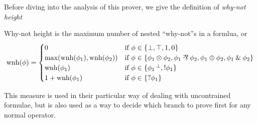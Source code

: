 \documentclass[a4paper, 12pt, tesi, english]{report}
\begin{document}
Before diving into the analysis of this prover, we give the definition of \textit{why-not height}
\begin{define}
	\label{def:why-not-height}
	Why-not height is the maximum number of nested ``why-not''s in a formlua, or
	$$ \text{wnh}(\phi) = 
	\begin{cases}	
		0 & \text{if }\phi \in \{\llbot, \lltop, \llone, \llzero\} \\
		\max(\text{wnh}(\phi_1), \text{wnh}(\phi_2)) & \text{if } \phi \in \{ \phi_1 \llten \phi_2, \phi_1 \llpar \phi_2, \phi_1 \llplus \phi_2, \phi_1 \llwith \phi_2 \} \\
		\text{wnh}(\phi_1) & \text{if }\phi \in \{ \llnot{\phi_1}, \llbang{\phi_1}\} \\
		1 + \text{wnh}(\phi_1) & \text{if }\phi \in \{ \llwn{\phi_1} \} 
	\end{cases}
	$$
\end{define}
This measure is used in their particular way of dealing with uncontrained formulae, but is also used as a way to decide which branch to prove first for any normal operator.
\end{document}
